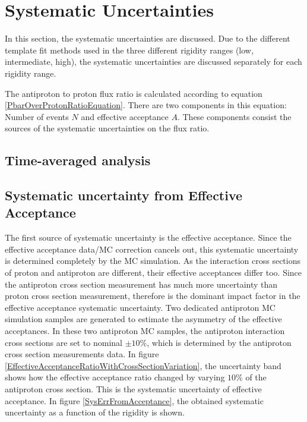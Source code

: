 
\section{Systematic Uncertainties} \label{SystematicUncertaintiesSection}

In this section, the systematic uncertainties are discussed. Due to the different template fit methods used in the three different rigidity ranges (low, intermediate, high), the systematic uncertainties are discussed separately for each rigidity range. \par

The antiproton to proton flux ratio is calculated according to equation \ref{PbarOverProtonRatioEquation}. There are two components in this equation: Number of events $N$ and effective acceptance $A$. These components consist the sources of the systematic uncertainties on the flux ratio. \par

\subsection{Time-averaged analysis}
\subsection*{Systematic uncertainty from Effective Acceptance}
The first source of systematic uncertainty is the effective acceptance. Since the effective acceptance data/MC correction cancels out, this systematic uncertainty is determined completely by the MC simulation. As the interaction cross sections of proton and antiproton are different, their effective acceptances differ too. Since the antiproton cross section measurement has much more uncertainty than proton cross section measurement, therefore is the dominant impact factor in the effective acceptance systematic uncertainty. Two dedicated antiproton MC simulation samples are generated to estimate the asymmetry of the effective acceptances. In these two antiproton MC samples, the antiproton interaction cross sections are set to nominal $\pm10\%$,  which is determined by the antiproton cross section measurements data. In figure \ref{EffectiveAcceptanceRatioWithCrossSectionVariation}, the uncertainty band shows how the effective acceptance ratio changed by varying $10\%$ of the antiproton cross section. This is the systematic uncertainty of effective acceptance. In figure \ref{SysErrFromAcceptance}, the obtained systematic uncertainty as a function of the rigidity is shown.  \par  

